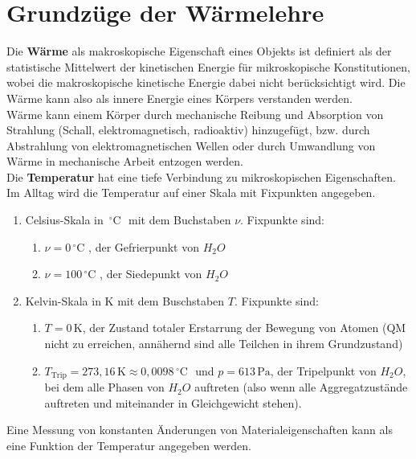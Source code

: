 \documentclass[a4paper,12pt]{article}
\begin{document}
\section{Grundzüge der Wärmelehre}
\indent Die \textbf{Wärme} als makroskopische Eigenschaft eines Objekts ist definiert als der statistische Mittelwert der kinetischen Energie für mikroskopische Konstitutionen, wobei die makroskopische kinetische Energie dabei nicht berücksichtigt wird. Die Wärme kann also als \glqq innere\grqq{} Energie eines Körpers verstanden werden.\\\indent
Wärme kann einem Körper durch mechanische Reibung und Absorption von Strahlung (Schall, elektromag\-ne\-tisch, radioaktiv) hinzugefügt, bzw. durch Abstrahlung von elektromagnetischen Wellen oder durch Umwandlung von Wärme in mechanische Arbeit entzogen werden.\\\indent
Die \textbf{Temperatur} hat eine tiefe Verbindung zu mikroskopischen Eigenschaften. Im Alltag wird die Temperatur auf einer Skala mit Fixpunkten angegeben.
\begin{enumerate}[label=]
        \item Celsius-Skala in $\,\text{$^\circ$C }$ mit dem Buchstaben $\nu $. Fixpunkte sind:
                \begin{enumerate}[label=]
                        \item $\nu =0\,\text{$^\circ$C }$, der Gefrierpunkt von $H_2O$ 
                        \item $\nu =100\,\text{$^\circ$C }$, der Siedepunkt von $H_2O$
                \end{enumerate}
        \item Kelvin-Skala in K mit dem Buschstaben $T$. Fixpunkte sind:
                \begin{enumerate}[label=]
                        \item $T=0\,\text{K}$, der Zustand totaler Erstarrung der Bewegung von Atomen (QM nicht zu erreichen, annähernd sind alle Teilchen in ihrem Grundzustand) 
                        \item $T_{\text{Trip}}=273,16\,\text{K}\approx 0,0098\,\text{$^\circ$C }$ und $p=613\,\text{Pa}$, der Tripelpunkt von $H_2O$, bei dem alle Phasen von $H_2O$ auftreten (also wenn alle Aggregatzustände auftreten und miteinander in Gleichgewicht stehen).
                \end{enumerate}
\end{enumerate}
Eine Messung von konstanten Änderungen von Materialeigenschaften kann als eine Funktion der Temperatur angegeben werden.
\end{document}
